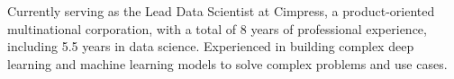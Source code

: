 

\begin{cvparagraph}

Currently serving as the Lead Data Scientist at Cimpress, a product-oriented multinational corporation, with a total of 8 years of 
professional experience, including 5.5 years in data science. Experienced in building complex deep learning and machine learning 
models to solve complex problems and use cases.
\end{cvparagraph}
